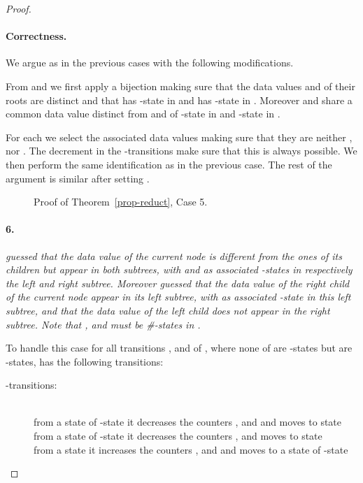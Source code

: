 \documentclass{CSML}
\begin{document}
\begin{proof}
\paragraph{\bf Correctness.}  
We argue as in the previous cases with the following modifications.

From  and  we first apply a bijection making sure that the
data values  and  of their roots are distinct and that  has
-state  in  and  has -state  in
. Moreover  and  share a common data value 
distinct from  and  of -state  in  and
-state  in .

For each  we select the associated data values making sure
that they are neither ,  nor . The decrement in the -transitions make sure
that this is always possible. We then perform the same identification as in the
previous case. 
The rest of the argument is similar after setting .

\begin{figure}
\small

\caption{Proof of Theorem~\ref{prop-reduct}, Case 5.}
\label{fig-reduct5}
\end{figure}







\paragraph{\bf 6.}
  \emph{ guessed that the data value  of the
  current node is different from the ones of its children but appear in both
  subtrees, with  and  as associated -states in respectively the left and right subtree. 
  Moreover  guessed that the data value of the right child of the current node appear in its
  left subtree, with  as associated -state in this left subtree, 
  and that the data value of the left child does not appear in the right subtree. 
  Note that ,  and  must be \#-states in .}

\noindent
To handle this case for all transitions 
,
 and 
 of , 
where none of  are -states but
 are -states,  has the following transitions:
\begin{description}
\item[\rm -transitions:]\quad\\
from a state  of -state 
it decreases the counters ,  and  
and moves to state \\
from a state  of -state  
it decreases the counters ,  
and moves to state \\
from a state 
it increases the counters ,  and  
and moves to a state  of -state 


\end{description}
\end{proof}
\end{document}
